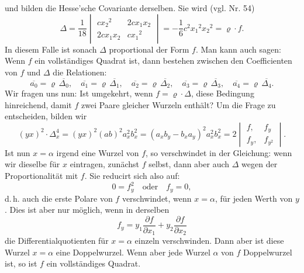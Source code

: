 und bilden die Hesse'sche Covariante derselben. Sie wird (vgl. Nr. 54)
\[
\Delta=\frac{1}{18}\begin{vmatrix}cx_2{}^2 & 2cx_1x_2\\ 2cx_1x_2 & cx_1{}^2\end{vmatrix}=-\frac{1}{6}c^2x_1{}^2x_2{}^2=\varrho\cdot f.
\]
In diesem Falle ist sonach $\Delta$ proportional der Form $f$. Man kann auch sagen: Wenn $f$ ein vollständiges Quadrat ist, dann bestehen zwischen den Coefficienten von $f$ und $\Delta$ die Relationen:
\[
\overline{a_0}=\varrho\,\overline{\Delta_0},\quad \overline{a_1}=\varrho\,\overline{\Delta_1},\quad \overline{a_2}=\varrho\,\overline{\Delta_2},\quad \overline{a_3}=\varrho\,\overline{\Delta_3},\quad \overline{a_4}=\varrho\,\overline{\Delta_4}.
\]
Wir fragen uns nun: Ist umgekehrt, wenn $f=\varrho\cdot\Delta$, diese Bedingung hinreichend, damit $f$ zwei Paare gleicher Wurzeln enthält? Um die Frage zu entscheiden, bilden wir
\[
(yx)^2\cdot\Delta_x^4=(yx)^2(ab)^2a_x^2b_x^2=(a_xb_y-b_xa_y)^2a_x^2b_x^2=2\begin{vmatrix}f, & f_y\\ f_y, & f_{y^2}\end{vmatrix}.
\]
Ist nun $x=\alpha$ irgend eine Wurzel von $f$, so verschwindet in der Gleichung:
wenn wir dieselbe für $x$ eintragen, zunächst $f$ selbst, dann aber auch $\Delta$ wegen der Proportionalität mit $f$. Sie reducirt sich also auf:
\[
0=f_y^2\quad\text{oder}\quad f_y=0,
\]
d.\,h. auch die erste Polare von $f$ verschwindet, wenn $x=\alpha$, für jeden Werth von $y$. Dies ist aber nur möglich, wenn in derselben
\[
f_y=y_1\frac{\partial f}{\partial x_1}+y_2\frac{\partial f}{\partial x_2}
\]
die Differentialquotienten für $x=\alpha$ einzeln verschwinden. Dann aber ist diese Wurzel $x=\alpha$ eine Doppelwurzel. Wenn aber jede Wurzel $\alpha$ von $f$ Doppelwurzel ist, so ist $f$ ein vollständiges Quadrat.

